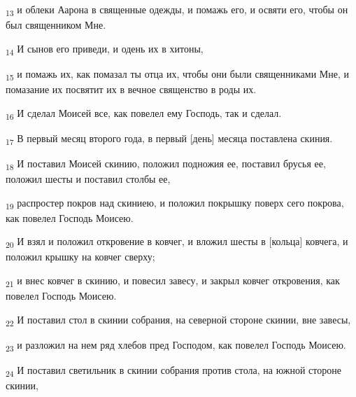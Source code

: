 \begin{tcolorbox}
\textsubscript{13} и облеки Аарона в священные одежды, и помажь его, и освяти его, чтобы он был священником Мне.
\end{tcolorbox}
\begin{tcolorbox}
\textsubscript{14} И сынов его приведи, и одень их в хитоны,
\end{tcolorbox}
\begin{tcolorbox}
\textsubscript{15} и помажь их, как помазал ты отца их, чтобы они были священниками Мне, и помазание их посвятит их в вечное священство в роды их.
\end{tcolorbox}
\begin{tcolorbox}
\textsubscript{16} И сделал Моисей все, как повелел ему Господь, так и сделал.
\end{tcolorbox}
\begin{tcolorbox}
\textsubscript{17} В первый месяц второго года, в первый [день] месяца поставлена скиния.
\end{tcolorbox}
\begin{tcolorbox}
\textsubscript{18} И поставил Моисей скинию, положил подножия ее, поставил брусья ее, положил шесты и поставил столбы ее,
\end{tcolorbox}
\begin{tcolorbox}
\textsubscript{19} распростер покров над скиниею, и положил покрышку поверх сего покрова, как повелел Господь Моисею.
\end{tcolorbox}
\begin{tcolorbox}
\textsubscript{20} И взял и положил откровение в ковчег, и вложил шесты в [кольца] ковчега, и положил крышку на ковчег сверху;
\end{tcolorbox}
\begin{tcolorbox}
\textsubscript{21} и внес ковчег в скинию, и повесил завесу, и закрыл ковчег откровения, как повелел Господь Моисею.
\end{tcolorbox}
\begin{tcolorbox}
\textsubscript{22} И поставил стол в скинии собрания, на северной стороне скинии, вне завесы,
\end{tcolorbox}
\begin{tcolorbox}
\textsubscript{23} и разложил на нем ряд хлебов пред Господом, как повелел Господь Моисею.
\end{tcolorbox}
\begin{tcolorbox}
\textsubscript{24} И поставил светильник в скинии собрания против стола, на южной стороне скинии,
\end{tcolorbox}
